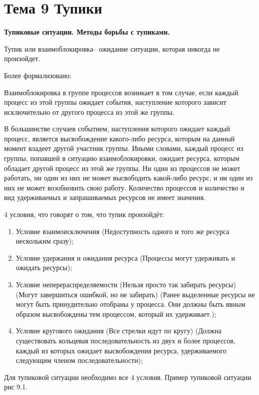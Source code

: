 \newpage 
\chapter{Тема 9 Тупики}

\begin{center}{\bfseries Тупиковые ситуации. Методы борьбы с тупиками.}
\end{center}
Тупик или взаимоблокировка– ожидание ситуации, которая никогда не произойдет. 

Более формализовано:

\begin{opr}
  Взаимоблокировка в группе процессов возникает в том случае, если каждый процесс из этой группы ожидает события, наступление которого зависит исключительно от другого процесса из этой же группы.
\end{opr}

  В большинстве случаев событием, наступления которого ожидает каждый процесс,
  является высвобождение какого-либо ресурса, которым на данный момент владеет
  другой участник группы. Иными словами, каждый процесс из группы, попавшей
  в ситуацию взаимоблокировки, ожидает ресурса, которым обладает другой процесс
  из этой же группы. Ни один из процессов не может работать, ни один из них не может
  высвободить какой-либо ресурс, и ни один из них не может возобновить свою работу.
  Количество процессов и количество и вид удерживаемых и запрашиваемых ресурсов
  не имеет значения.

  
\begin{utv}
  4 условия, что говорят о том, что тупик произойдёт:
  \begin{enumerate}
    \item Условие взаимоисключения (Недоступность одного и того же ресурса нескольким сразу);
    \item Условие удержания и ожидания ресурса (Процессы могут удерживать и ожидать ресурсы);
    \item Условие неперераспределяемости (Нельзя просто так забирать ресурсы) (Могут завершиться ошибкой, но не забирать) (Ранее выделенные ресурсы не могут быть принудительно отобраны у процесса. Они должны быть явным образом высвобождены тем процессом, который их удерживает.);
    \item Условие кругового ожидания (Все стрелки идут по кругу) (Должна существовать кольцевая последовательность из двух и более процессов, каждый из которых ожидает высвобождения ресурса, удерживаемого следующим членом последовательности);
  \end{enumerate}
\end{utv}
Для тупиковой ситуации необходимо все 4 условия. Пример тупиковой ситуации рис 9.1.

